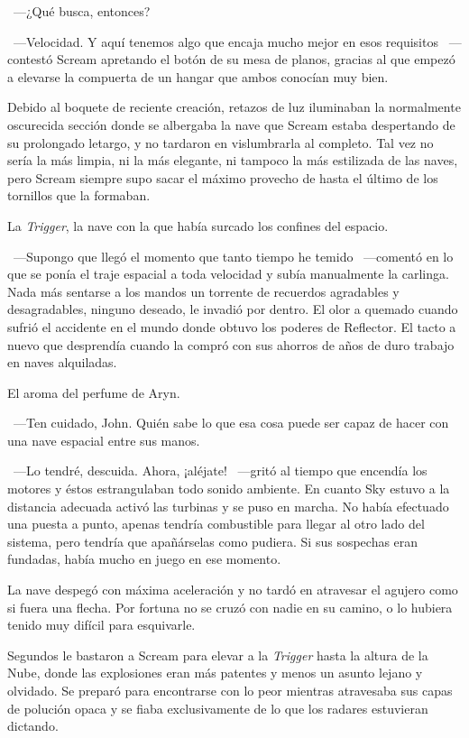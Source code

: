 ~---¿Qué busca, entonces?

~---Velocidad. Y aquí tenemos algo que encaja mucho mejor en esos requisitos ~---contestó Scream apretando el botón de su mesa de planos, gracias al que empezó a elevarse la compuerta de un hangar que ambos conocían muy bien.

Debido al boquete de reciente creación, retazos de luz iluminaban la normalmente oscurecida sección donde se albergaba la nave que Scream estaba despertando de su prolongado letargo, y no tardaron en vislumbrarla al completo. Tal vez no sería la más limpia, ni la más elegante, ni tampoco la más estilizada de las naves, pero Scream siempre supo sacar el máximo provecho de hasta el último de los tornillos que la formaban.

La \emph{Trigger}, la nave con la que había surcado los confines del espacio.

~---Supongo que llegó el momento que tanto tiempo he temido ~---comentó en lo que se ponía el traje espacial a toda velocidad y subía manualmente la carlinga. Nada más sentarse a los mandos un torrente de recuerdos agradables y desagradables, ninguno deseado, le invadió por dentro. El olor a quemado cuando sufrió el accidente en el mundo donde obtuvo los poderes de Reflector. El tacto a nuevo que desprendía cuando la compró con sus ahorros de años de duro trabajo en naves alquiladas.

El aroma del perfume de Aryn.

~---Ten cuidado, John. Quién sabe lo que esa cosa puede ser capaz de hacer con una nave espacial entre sus manos.

~---Lo tendré, descuida. Ahora, ¡aléjate! ~---gritó al tiempo que encendía los motores y éstos estrangulaban todo sonido ambiente. En cuanto Sky estuvo a la distancia adecuada activó las turbinas y se puso en marcha. No había efectuado una puesta a punto, apenas tendría combustible para llegar al otro lado del sistema, pero tendría que apañárselas como pudiera. Si sus sospechas eran fundadas, había mucho en juego en ese momento.

La nave despegó con máxima aceleración y no tardó en atravesar el agujero como si fuera una flecha. Por fortuna no se cruzó con nadie en su camino, o lo hubiera tenido muy difícil para esquivarle.

Segundos le bastaron a Scream para elevar a la \emph{Trigger} hasta la altura de la Nube, donde las explosiones eran más patentes y menos un asunto lejano y olvidado. Se preparó para encontrarse con lo peor mientras atravesaba sus capas de polución opaca y se fiaba exclusivamente de lo que los radares estuvieran dictando.


